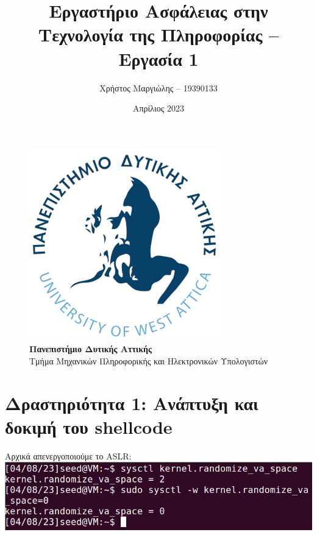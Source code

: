 \documentclass[12pt]{article}
\title{Εργαστήριο Ασφάλειας στην Τεχνολογία της Πληροφορίας -- Εργασία 1}
\author{Χρήστος Μαργιώλης -- 19390133}
\date{Απρίλιος 2023}
\begin{document}
\begin{titlepage}
        \maketitle
        \begin{figure}[t!]
        \begin{center}
        \includegraphics[scale=0.3]{./res/uniwalogo.png} \\
        \Large
        \textbf{Πανεπιστήμιο Δυτικής Αττικής} \\
        \large
        Τμήμα Μηχανικών Πληροφορικής και Ηλεκτρονικών Υπολογιστών
        \end{center}
        \end{figure}
\end{titlepage}

\renewcommand{\contentsname}{Περιεχόμενα}
\tableofcontents
\pagebreak

\section{Δραστηριότητα 1: Ανάπτυξη και δοκιμή του shellcode}

Αρχικά απενεργοποιούμε το ASLR: \\

\includegraphics[width=\textwidth]{res/aslr.png} \\
\end{document}
